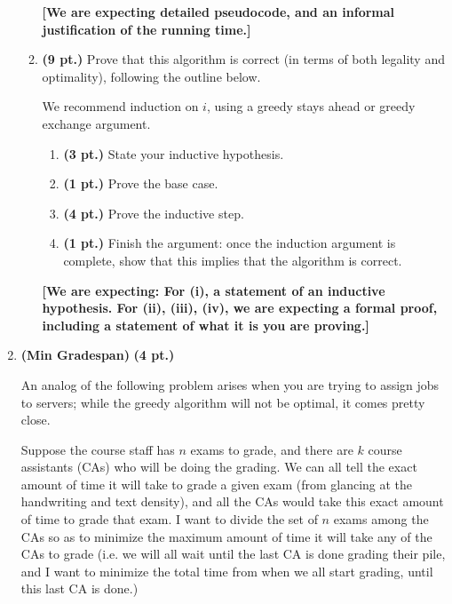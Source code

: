 \documentclass{article}
\begin{document}
\begin{enumerate}
\begin{enumerate}
        \textbf{[We are expecting detailed pseudocode, and an informal
        justification of the running time.]}

      \item \textbf{(9 pt.)} Prove that this algorithm is correct (in terms of
        both legality and optimality), following the outline below.

        We recommend induction on $i$, using a greedy stays ahead or greedy
        exchange argument.

        \begin{enumerate}
          \item \textbf{(3 pt.)} State your inductive hypothesis.
          \item \textbf{(1 pt.)} Prove the base case.
          \item \textbf{(4 pt.)} Prove the inductive step. 
          \item \textbf{(1 pt.)} Finish the argument: once the induction
            argument is complete, show that this implies that the algorithm is
            correct.
        \end{enumerate}

        \textbf{[We are expecting: For (i), a statement of an inductive
          hypothesis. For (ii), (iii), (iv), we are expecting a formal proof,
          including a statement of what it is you are proving.]}
    \end{enumerate}
  \item \textbf{(Min Gradespan)} \textbf{(4 pt.)}

    An analog of the following problem arises when you are trying to assign
    jobs to servers; while the greedy algorithm will not be optimal, it comes
    pretty close.

    Suppose the course staff has $n$ exams to grade, and there are $k$ course
    assistants (CAs) who will be doing the grading. We can all tell the exact
    amount of time it will take to grade a given exam (from glancing at the
    handwriting and text density), and all the CAs would take this exact amount
    of time to grade that exam. I want to divide the set of $n$ exams among the
    CAs so as to minimize the maximum amount of time it will take any of the
    CAs to grade (i.e. we will all wait until the last CA is done grading their
    pile, and I want to minimize the total time from when we all start grading,
    until this last CA is done.)


\end{enumerate}
\end{document}
